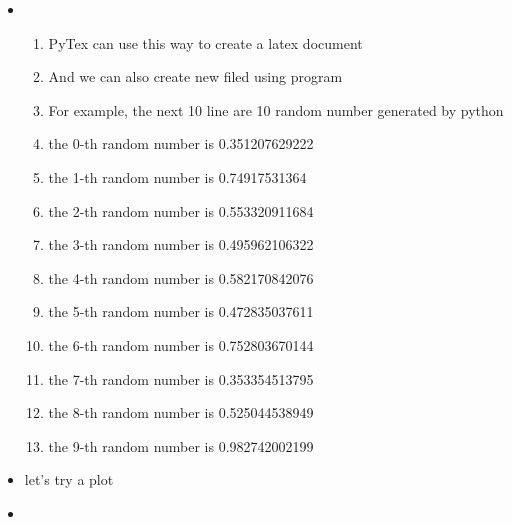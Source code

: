 \begin{itemize}
\begin{itemize}
\begin{tabular}{ l l l l l }
\end{tabular}
\item \begin{enumerate}
\item PyTex can use this way to create a latex document
\item And we can also create new filed using program
\item For example, the next 10 line are 10 random number generated by python
\item the 0-th random number is 0.351207629222
\item the 1-th random number is 0.74917531364
\item the 2-th random number is 0.553320911684
\item the 3-th random number is 0.495962106322
\item the 4-th random number is 0.582170842076
\item the 5-th random number is 0.472835037611
\item the 6-th random number is 0.752803670144
\item the 7-th random number is 0.353354513795
\item the 8-th random number is 0.525044538949
\item the 9-th random number is 0.982742002199
\end{enumerate}
\item let's try a plot
\item {}
\end{itemize}
\end{itemize}
